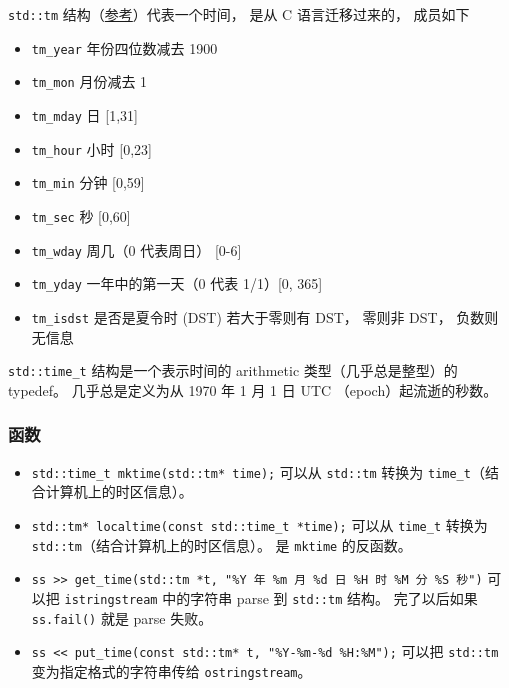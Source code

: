 
\begin{issues}
\issueDraft
\end{issues}


\verb|std::tm| 结构（\href{https://en.cppreference.com/w/cpp/chrono/c/tm}{参考}）代表一个时间， 是从 C 语言迁移过来的， 成员如下
\begin{itemize}
\item \verb|tm_year| 年份四位数减去 1900
\item \verb|tm_mon| 月份减去 1
\item \verb|tm_mday| 日 [1,31]
\item \verb|tm_hour| 小时 [0,23]
\item \verb|tm_min| 分钟 [0,59]
\item \verb|tm_sec| 秒 [0,60]
\end{itemize}
\begin{itemize}
\item \verb|tm_wday| 周几（0 代表周日） [0-6]
\item \verb|tm_yday| 一年中的第一天（0 代表 1/1）[0, 365]
\item \verb|tm_isdst| 是否是夏令时 (DST) 若大于零则有 DST， 零则非 DST， 负数则无信息
\end{itemize}

\verb|std::time_t| 结构是一个表示时间的 arithmetic 类型（几乎总是整型）的 typedef。 几乎总是定义为从 1970 年 1 月 1 日 UTC （epoch）起流逝的秒数。

\subsubsection{函数}
\begin{itemize}
\item \verb|std::time_t mktime(std::tm* time);| 可以从 \verb|std::tm| 转换为 \verb|time_t|（结合计算机上的时区信息）。
\item \verb|std::tm* localtime(const std::time_t *time);| 可以从 \verb|time_t| 转换为 \verb|std::tm|（结合计算机上的时区信息）。 是 \verb|mktime| 的反函数。
\item \verb|ss >> get_time(std::tm *t, "%Y 年 %m 月 %d 日 %H 时 %M 分 %S 秒")| 可以把 \verb|istringstream| 中的字符串 parse 到 \verb|std::tm| 结构。 完了以后如果 \verb|ss.fail()| 就是 parse 失败。
\item \verb|ss << put_time(const std::tm* t, "%Y-%m-%d %H:%M");| 可以把 \verb|std::tm| 变为指定格式的字符串传给 \verb|ostringstream|。
\end{itemize}
